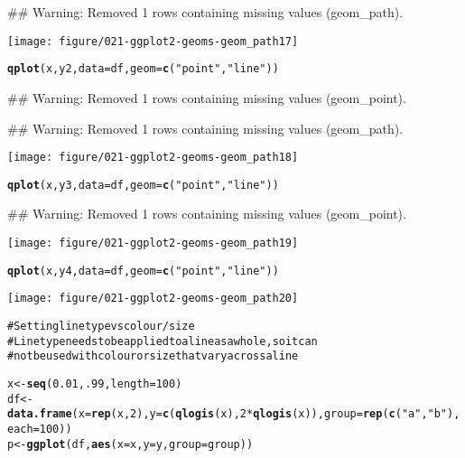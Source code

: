 \documentclass[a4paper,titlepage]{tufte-handout}\usepackage{graphicx, color}
\makeatletter
\def\maxwidth{ %
  \ifdim\Gin@nat@width>\linewidth
    \linewidth
  \else
    \Gin@nat@width
  \fi
}
\newcommand{\hlfunctioncall}[1]{\textcolor[rgb]{0.501960784313725,0,0.329411764705882}{\textbf{#1}}}%
\newcommand{\hlstring}[1]{\textcolor[rgb]{0.6,0.6,1}{#1}}%
\newcommand{\hlcomment}[1]{\textcolor[rgb]{0.180392156862745,0.6,0.341176470588235}{#1}}%
\newenvironment{kframe}{%
 \def\at@end@of@kframe{}%
 \ifinner\ifhmode%
  \def\at@end@of@kframe{\end{minipage}}%
  \begin{minipage}{\columnwidth}%
 \fi\fi%
 \def\FrameCommand##1{\hskip\@totalleftmargin \hskip-\fboxsep
 \colorbox{shadecolor}{##1}\hskip-\fboxsep
     \hskip-\linewidth \hskip-\@totalleftmargin \hskip\columnwidth}%
 \MakeFramed {\advance\hsize-\width
   \@totalleftmargin\z@ \linewidth\hsize
   \@setminipage}}%
 {\par\unskip\endMakeFramed%
 \at@end@of@kframe}
\newenvironment{knitrout}{}{} %
\makeatother
\begin{document}
\begin{knitrout}
\begin{kframe}
{\ttfamily\noindent\textcolor{warningcolor}{\#\# Warning: Removed 1 rows containing missing values (geom\_path).}}\end{kframe}
\texttt{[image: figure/021-ggplot2-geoms-geom\_path17]} 
\begin{kframe}\begin{alltt}
\hlfunctioncall{qplot}(x, y2, data = df, geom = \hlfunctioncall{c}(\hlstring{"point"},\hlstring{"line"}))
\end{alltt}


{\ttfamily\noindent\textcolor{warningcolor}{\#\# Warning: Removed 1 rows containing missing values (geom\_point).}}

{\ttfamily\noindent\textcolor{warningcolor}{\#\# Warning: Removed 1 rows containing missing values (geom\_path).}}\end{kframe}
\texttt{[image: figure/021-ggplot2-geoms-geom\_path18]} 
\begin{kframe}\begin{alltt}
\hlfunctioncall{qplot}(x, y3, data = df, geom = \hlfunctioncall{c}(\hlstring{"point"},\hlstring{"line"}))
\end{alltt}


{\ttfamily\noindent\textcolor{warningcolor}{\#\# Warning: Removed 1 rows containing missing values (geom\_point).}}\end{kframe}
\texttt{[image: figure/021-ggplot2-geoms-geom\_path19]} 
\begin{kframe}\begin{alltt}
\hlfunctioncall{qplot}(x, y4, data = df, geom = \hlfunctioncall{c}(\hlstring{"point"},\hlstring{"line"}))
\end{alltt}
\end{kframe}
\texttt{[image: figure/021-ggplot2-geoms-geom\_path20]} 
\begin{kframe}\begin{alltt}

\hlcomment{# Setting line type vs colour/size}
\hlcomment{# Line type needs to be applied to a line as a whole, so it can}
\hlcomment{# not be used with colour or size that vary across a line}

x <- \hlfunctioncall{seq}(0.01, .99, length=100)
df <- \hlfunctioncall{data.frame}(x = \hlfunctioncall{rep}(x, 2), y = \hlfunctioncall{c}(\hlfunctioncall{qlogis}(x), 2 * \hlfunctioncall{qlogis}(x)), group = \hlfunctioncall{rep}(\hlfunctioncall{c}(\hlstring{"a"},\hlstring{"b"}), each=100))
p <- \hlfunctioncall{ggplot}(df, \hlfunctioncall{aes}(x=x, y=y, group=group))


\end{alltt}
\end{kframe}
\end{knitrout}
\end{document}
